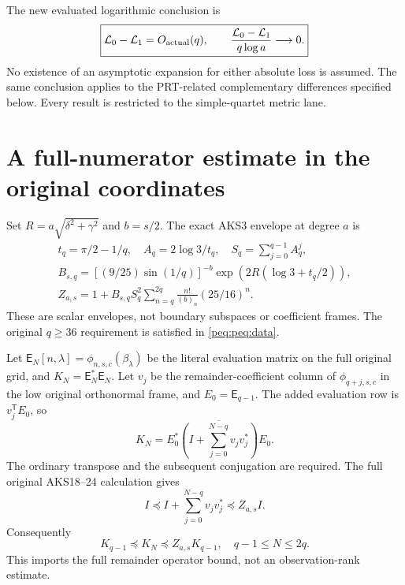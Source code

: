 The new evaluated logarithmic conclusion is
\begin{equation}
 \boxed{\mathcal L_0-\mathcal L_1=O_{\rm actual}(q),\qquad
 \frac{\mathcal L_0-\mathcal L_1}{q\log a}\longrightarrow0.}
 \label{peq:peq:main}
\end{equation}
No existence of an asymptotic expansion for either absolute loss is assumed. The same conclusion applies to the PRT-related complementary differences specified below. Every result is restricted to the simple-quartet metric lane.

\section{A full-numerator estimate in the original coordinates}
Set $R=a\sqrt{\delta^2+\gamma^2}$ and $b=s/2$. The exact AKS3 envelope at degree $a$ is
\begin{equation}
\begin{gathered}
 t_q=\pi/2-1/q,\quad A_q=2\log3/t_q,\quad
 S_q=\sum_{j=0}^{q-1}A_q^j,\\
 B_{s,q}=[(9/25)\sin(1/q)]^{-b}
              \exp(2R(\log3+t_q/2)),\\
 Z_{a,s}=1+B_{s,q}S_q^2\sum_{n=q}^{2q}
                \frac{n!}{(b)_n}(25/16)^n.
\end{gathered}\label{peq:peq:Z}
\end{equation}
These are scalar envelopes, not boundary subspaces or coefficient frames. The original $q\ge36$ requirement is satisfied in \eqref{peq:peq:data}.

Let $\mathsf E_N[n,\lambda]=\phi_{n,s,c}(\beta_\lambda)$ be the literal evaluation matrix on the full original grid, and $K_N=\mathsf E_N^*\mathsf E_N$. Let $v_j$ be the remainder-coefficient column of $\phi_{q+j,s,c}$ in the low original orthonormal frame, and $E_0=\mathsf E_{q-1}$. The added evaluation row is $v_j^{\mathsf T}E_0$, so
\begin{equation}
 K_N=E_0^*\overline{\left(I+\sum_{j=0}^{N-q}v_jv_j^*\right)}E_0.
 \label{peq:peq:numgram}
\end{equation}
The ordinary transpose and the subsequent conjugation are required. The full original AKS18--24 calculation gives
\[
 I\preceq I+\sum_{j=0}^{N-q}v_jv_j^*\preceq Z_{a,s}I.
\]
Consequently
\begin{equation}
 \boxed{K_{q-1}\preceq K_N\preceq Z_{a,s}K_{q-1},
                  \quad q-1\le N\le2q.}\label{peq:peq:num-bound}
\end{equation}
This imports the full remainder operator bound, not an observation-rank estimate.

